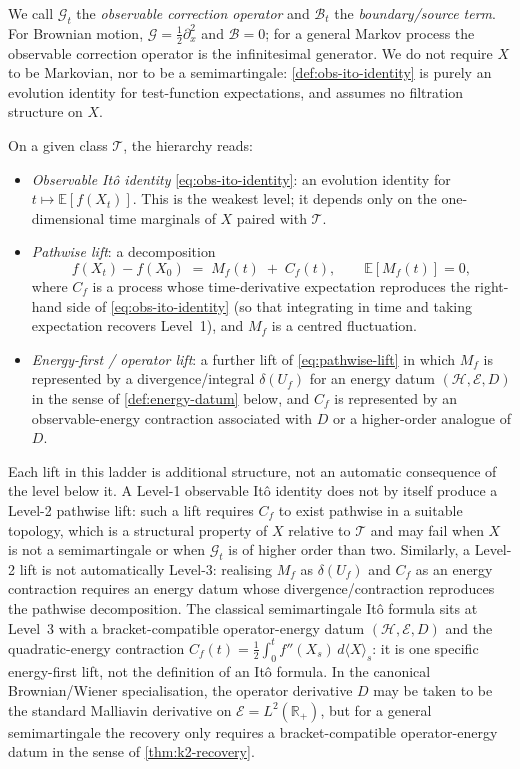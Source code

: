 \documentclass[11pt,reqno]{amsart}
\theoremstyle{plain}
\theoremstyle{definition}
\theoremstyle{remark}
\newcommand{\R}{\mathbb{R}}
\newcommand{\E}{\mathbb{E}}
\newcommand{\Hilb}{\mathcal{H}}
\newcommand{\Energy}{\mathcal{E}}
\begin{document}
We call $\mathcal G_t$ the \emph{observable correction operator}
and $\mathcal B_t$ the \emph{boundary/source term}. For Brownian
motion, $\mathcal G=\tfrac12\partial_x^{2}$ and $\mathcal B=0$; for
a general Markov process the observable correction operator is the
infinitesimal generator. We do not require $X$ to be Markovian, nor
to be a semimartingale: \cref{def:obs-ito-identity} is purely an
evolution identity for test-function expectations, and assumes no
filtration structure on $X$.

On a given class $\mathcal T$, the hierarchy reads:
\begin{itemize}
\item[\textbf{Level 1.}] \emph{Observable It\^o identity}
  \eqref{eq:obs-ito-identity}: an evolution identity for
  $t\mapsto\E[f(X_t)]$. This is the weakest level; it depends only
  on the one-dimensional time marginals of $X$ paired with
  $\mathcal T$.
\item[\textbf{Level 2.}] \emph{Pathwise lift}: a decomposition
  \begin{equation}\label{eq:pathwise-lift}
    f(X_t)-f(X_0)\;=\;M_f(t)\;+\;C_f(t),
    \qquad \E[M_f(t)]=0,
  \end{equation}
  where $C_f$ is a process whose time-derivative expectation
  reproduces the right-hand side of \eqref{eq:obs-ito-identity}
  (so that integrating in time and taking expectation recovers
  Level~1), and $M_f$ is a centred fluctuation.
\item[\textbf{Level 3.}] \emph{Energy-first / operator lift}: a
  further lift of \eqref{eq:pathwise-lift} in which $M_f$ is
  represented by a divergence/integral $\delta(U_f)$ for an energy
  datum $(\Hilb,\Energy,D)$ in the sense of \cref{def:energy-datum}
  below, and $C_f$ is represented by an observable-energy
  contraction associated with $D$ or a higher-order analogue
  of $D$.
\end{itemize}

Each lift in this ladder is additional structure, not an automatic
consequence of the level below it. A Level-1 observable It\^o
identity does not by itself produce a Level-2 pathwise lift: such a
lift requires $C_f$ to exist
pathwise in a suitable topology, which is a structural property of
$X$ relative to $\mathcal T$ and may fail when $X$ is not a
semimartingale or when $\mathcal G_t$ is of higher order than two.
Similarly, a Level-2 lift is not automatically Level-3: realising
$M_f$ as $\delta(U_f)$ and $C_f$ as an energy contraction requires
an energy datum whose divergence/contraction reproduces the
pathwise decomposition. The classical semimartingale It\^o formula
sits at Level~3 with a bracket-compatible operator-energy datum
$(\Hilb,\Energy,D)$ and the quadratic-energy contraction
$C_f(t)=\tfrac12\int_0^t f''(X_s)\,d\langle X\rangle_s$: it is one
specific energy-first lift, not the definition of an It\^o formula.
In the canonical Brownian/Wiener specialisation, the operator
derivative $D$ may be taken to be the standard Malliavin derivative on
$\Energy=L^{2}(\R_{+})$, but for a general semimartingale the
recovery only requires a bracket-compatible operator-energy datum in
the sense of \cref{thm:k2-recovery}.
\end{document}
